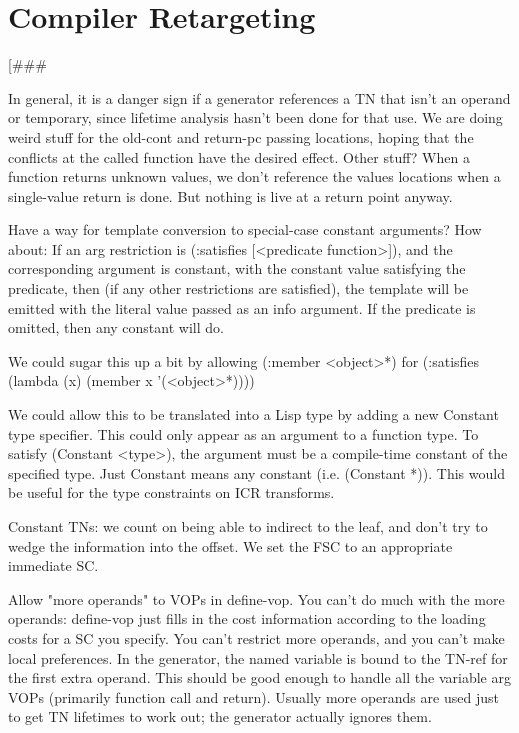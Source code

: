 \part{Compiler Retargeting}

[\#\#\#

In general, it is a danger sign if a generator references a TN that isn't an
operand or temporary, since lifetime analysis hasn't been done for that use.
We are doing weird stuff for the old-cont and return-pc passing locations,
hoping that the conflicts at the called function have the desired effect.
Other stuff?  When a function returns unknown values, we don't reference the
values locations when a single-value return is done.  But nothing is live at a
return point anyway.



Have a way for template conversion to special-case constant arguments?  
How about:
    If an arg restriction is (:satisfies [<predicate function>]), and the
    corresponding argument is constant, with the constant value satisfying the
    predicate, then (if any other restrictions are satisfied), the template
    will be emitted with the literal value passed as an info argument.  If the
    predicate is omitted, then any constant will do.

    We could sugar this up a bit by allowing (:member <object>*) for
    (:satisfies (lambda (x) (member x '(<object>*))))

We could allow this to be translated into a Lisp type by adding a new Constant
type specifier.  This could only appear as an argument to a function type.
To satisfy (Constant <type>), the argument must be a compile-time constant of
the specified type.  Just Constant means any constant (i.e. (Constant *)).
This would be useful for the type constraints on ICR transforms.


Constant TNs: we count on being able to indirect to the leaf, and don't try to
wedge the information into the offset.  We set the FSC to an appropriate
immediate SC.

    Allow "more operands" to VOPs in define-vop.  You can't do much with the
    more operands: define-vop just fills in the cost information according to
    the loading costs for a SC you specify.  You can't restrict more operands,
    and you can't make local preferences.  In the generator, the named variable
    is bound to the TN-ref for the first extra operand.  This should be good
    enough to handle all the variable arg VOPs (primarily function call and
    return).  Usually more operands are used just to get TN lifetimes to work
    out; the generator actually ignores them.

